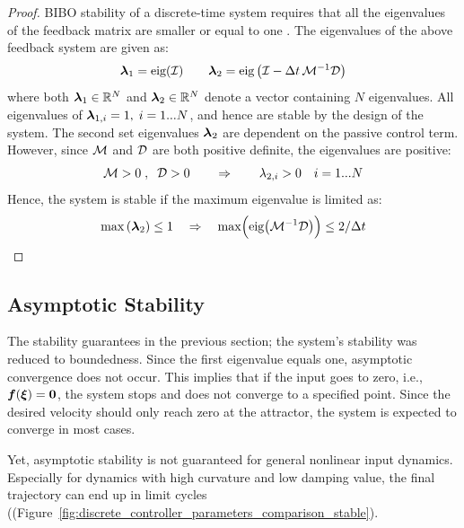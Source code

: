 \begin{proof}
BIBO stability of a discrete-time system requires that all the eigenvalues of the feedback matrix are smaller or equal to one \cite{friedland2012control}.
The eigenvalues of the above feedback system are given as:
\begin{equation}
	\boldsymbol{\lambda}_1 = \text{eig}(\mathcal{I}) \qquad \boldsymbol{\lambda}_2 = \text{eig} \left(\mathcal{I} - \Delta t \, \mathcal{M}^{-1} \mathcal{D} \right)
\end{equation}
where both $\boldsymbol{\lambda}_1 \in \mathbb{R}^N$ and $\boldsymbol{\lambda}_2 \in \mathbb{R}^N$ denote a vector containing $N$ eigenvalues.
All eigenvalues of $\boldsymbol{\lambda}_{1, i} = 1, \; i = 1...N$, and hence are stable by the design of the system. 
The second set eigenvalues $\boldsymbol{\lambda}_2$  are dependent on the passive control term. 
However, since $\mathcal{M}$ and $\mathcal{D}$ are both positive definite, the eigenvalues are positive:
\begin{equation}
	\mathcal{M} > 0 \; , \;\; \mathcal{D} > 0 
	\qquad \Rightarrow \qquad
	\lambda_{2, i} > 0 \quad i = 1...N
\end{equation}
Hence, the system is stable if the maximum eigenvalue is limited as:
\begin{equation}
	\max \left(\boldsymbol{\lambda}_2 \right) \leq 1 
	\quad \Rightarrow \quad
	\max \Bigl( \text{eig}\bigl(\mathcal{M}^{-1} \mathcal{D} \bigr)  \Bigr) \leq 2 / \Delta t
\end{equation}
\end{proof}


\subsection{Asymptotic Stability}
The stability guarantees in the previous section; the system's stability was reduced to boundedness. 
Since the first eigenvalue equals one, asymptotic convergence does not occur. 
This implies that if the input goes to zero, i.e., $\boldsymbol{f}(\boldsymbol{\xi}) = \boldsymbol{0}$, the system stops and does not converge to a specified point. Since the desired velocity should only reach zero at the attractor, the system is expected to converge in most cases.

Yet, asymptotic stability is not guaranteed for general nonlinear input dynamics. Especially for dynamics with high curvature and low damping value, the final trajectory can end up in limit cycles ((Figure~\ref{fig:discrete_controller_parameters_comparison_stable}).

